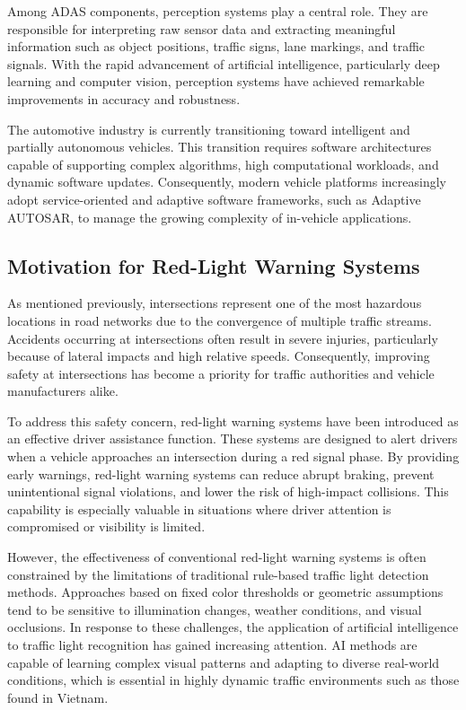 Among ADAS components, perception systems play a central role. They are responsible for interpreting raw sensor data and extracting meaningful information such as object positions, traffic signs, lane markings, and traffic signals. With the rapid advancement of artificial intelligence, particularly deep learning and computer vision, perception systems have achieved remarkable improvements in accuracy and robustness.

The automotive industry is currently transitioning toward intelligent and partially autonomous vehicles. This transition requires software architectures capable of supporting complex algorithms, high computational workloads, and dynamic software updates. Consequently, modern vehicle platforms increasingly adopt service-oriented and adaptive software frameworks, such as Adaptive AUTOSAR, to manage the growing complexity of in-vehicle applications.

\subsection{Motivation for Red-Light Warning Systems}

As mentioned previously, intersections represent one of the most hazardous locations in road networks due to the convergence of multiple traffic streams. Accidents occurring at intersections often result in severe injuries, particularly because of lateral impacts and high relative speeds. Consequently, improving safety at intersections has become a priority for traffic authorities and vehicle manufacturers alike.

To address this safety concern, red-light warning systems have been introduced as an effective driver assistance function. These systems are designed to alert drivers when a vehicle approaches an intersection during a red signal phase. By providing early warnings, red-light warning systems can reduce abrupt braking, prevent unintentional signal violations, and lower the risk of high-impact collisions. This capability is especially valuable in situations where driver attention is compromised or visibility is limited.

However, the effectiveness of conventional red-light warning systems is often constrained by the limitations of traditional rule-based traffic light detection methods. Approaches based on fixed color thresholds or geometric assumptions tend to be sensitive to illumination changes, weather conditions, and visual occlusions. In response to these challenges, the application of artificial intelligence to traffic light recognition has gained increasing attention. AI methods are capable of learning complex visual patterns and adapting to diverse real-world conditions, which is essential in highly dynamic traffic environments such as those found in Vietnam.

